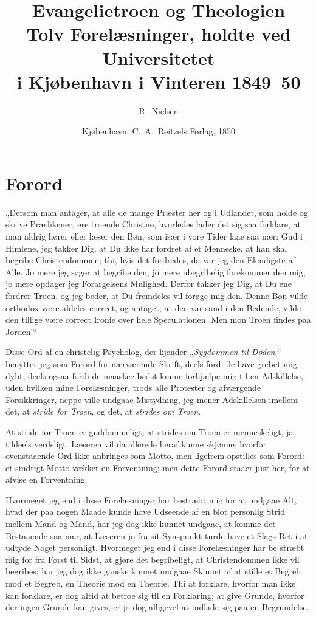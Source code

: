 \documentclass[12pt,a4paper]{book}
\title{\textbf{Evangelietroen og Theologien}\\[6pt]
  \large Tolv Forelæsninger, holdte ved Universitetet\\
  i Kjøbenhavn i Vinteren 1849--50}
\author{R.\ Nielsen}
\date{Kjøbenhavn: C.\ A.\ Reitzels Forlag, 1850}
\begin{document}
\maketitle
\thispagestyle{empty}
\newpage

\tableofcontents
\newpage

\chapter*{Forord}
\label{ch:forord}

„Dersom man antager, at alle de mange Præster her og i Udlandet, som holde
og skrive Prædikener, ere troende Christne, hvorledes lader det sig saa
forklare, at man aldrig hører eller læser den Bøn, som især i vore Tider
laae saa nær: Gud i Himlene, jeg takker Dig, at Du ikke har fordret af et
Menneske, at han skal begribe Christendommen; thi, hvis det fordredes, da var
jeg den Elendigste af Alle. Jo mere jeg søger at begribe den, jo mere
ubegribelig forekommer den mig, jo mere opdager jeg Forargelsens Mulighed.
Derfor takker jeg Dig, at Du ene fordrer Troen, og jeg beder, at Du fremdeles
vil forøge mig den. Denne Bøn vilde orthodox være aldeles correct, og antaget,
at den var sand i den Bedende, vilde den tillige være correct Ironie over hele
Speculationen. Men mon Troen findes paa Jorden!“

Disse Ord af en christelig Psycholog, der kjender „\emph{Sygdommen til Døden},“
benytter jeg som Forord for nærværende Skrift, deels fordi de have grebet mig
dybt, deels ogsaa fordi de maaskee bedst kunne forhjælpe mig til en
Adskillelse, uden hvilken mine Forelæsninger, trods alle Protester og
afværgende Forsikkringer, neppe ville undgaae Mistydning, jeg mener
Adskillelsen imellem det, at \emph{stride for Troen}, og det, at \emph{strides om Troen}.

At stride for Troen er guddommeligt; at strides om Troen er menneskeligt, ja
tildeels verdsligt. Læseren vil da allerede heraf kunne skjønne, hvorfor
ovenstaaende Ord ikke anbringes som Motto, men ligefrem opstilles som Forord:
et sindrigt Motto vækker en Forventning; men dette Forord staaer just her, for
at afvise en Forventning.

Hvormeget jeg end i disse Forelæsninger har bestræbt mig for at undgaae Alt,
hvad der paa nogen Maade kunde have Udseende af en blot personlig Strid mellem
Mand og Mand, har jeg dog ikke kunnet undgaae, at komme det Bestaaende saa
nær, at Læseren jo fra sit Synspunkt turde have et Slags Ret i at udtyde Noget
personligt. Hvormeget jeg end i disse Forelæsninger har be\-%
stræbt mig for fra
Først til Sidst, at gjøre det begribeligt, at Christendommen ikke vil begribes;
har jeg dog ikke ganske kunnet undgaae Skinnet af at stille et Begreb mod et
Begreb, en Theorie mod en Theorie. Thi at forklare, hvorfor man ikke kan
forklare, er dog altid at betroe sig til en Forklaring; at give Grunde, hvorfor
der ingen Grunde kan gives, er jo dog alligevel at indlade sig paa en
Begrundelse.
\end{document}
